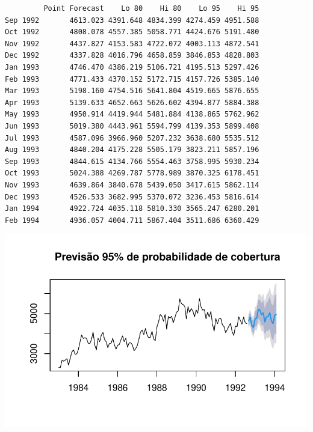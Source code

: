 \documentclass[
  letterpaper,
  DIV=11,
  numbers=noendperiod]{scrartcl}
\begin{document}
\begin{verbatim}
         Point Forecast    Lo 80    Hi 80    Lo 95    Hi 95
Sep 1992       4613.023 4391.648 4834.399 4274.459 4951.588
Oct 1992       4808.078 4557.385 5058.771 4424.676 5191.480
Nov 1992       4437.827 4153.583 4722.072 4003.113 4872.541
Dec 1992       4337.828 4016.796 4658.859 3846.853 4828.803
Jan 1993       4746.470 4386.219 5106.721 4195.513 5297.426
Feb 1993       4771.433 4370.152 5172.715 4157.726 5385.140
Mar 1993       5198.160 4754.516 5641.804 4519.665 5876.655
Apr 1993       5139.633 4652.663 5626.602 4394.877 5884.388
May 1993       4950.914 4419.944 5481.884 4138.865 5762.962
Jun 1993       5019.380 4443.961 5594.799 4139.353 5899.408
Jul 1993       4587.096 3966.960 5207.232 3638.680 5535.512
Aug 1993       4840.204 4175.228 5505.179 3823.211 5857.196
Sep 1993       4844.615 4134.766 5554.463 3758.995 5930.234
Oct 1993       5024.388 4269.787 5778.989 3870.325 6178.451
Nov 1993       4639.864 3840.678 5439.050 3417.615 5862.114
Dec 1993       4526.533 3682.995 5370.072 3236.453 5816.614
Jan 1994       4922.724 4035.118 5810.330 3565.247 6280.201
Feb 1994       4936.057 4004.711 5867.404 3511.686 6360.429
\end{verbatim}

\includegraphics{T2_grupo5_files/figure-pdf/previsao-pontual-4.pdf}
\end{document}
